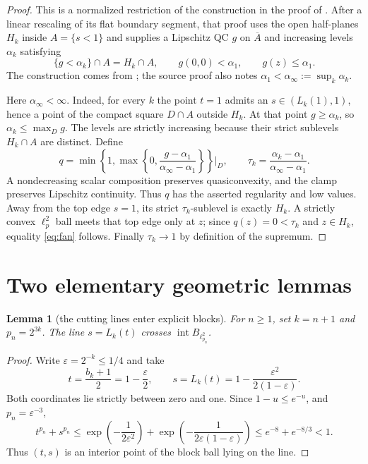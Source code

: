 \documentclass[11pt]{article}
\newtheorem{lemma}{Lemma}
\newcommand{\eps}{\varepsilon}
\begin{document}
\begin{proof}
This is a normalized restriction of the construction in the proof of
\cite[Theorem~3.2]{source}.  After a linear rescaling of its flat boundary
segment, that proof uses the open half-planes $H_k$ inside
$A=\{s<1\}$ and supplies a Lipschitz QC $g$ on $\overline A$ and increasing
levels $\alpha_k$ satisfying
\[
  \{g<\alpha_k\}\cap A=H_k\cap A,\qquad
  g(0,0)<\alpha_1,\qquad g(z)\le\alpha_1.
\]
The construction comes from \cite[Lemma~2.9]{fanpaper}; the source proof
also notes $\alpha_1<\alpha_\infty:=\sup_k\alpha_k$.

Here $\alpha_\infty<\infty$.  Indeed, for every $k$ the point $t=1$ admits
an $s\in(L_k(1),1)$, hence a point of the compact square $D\cap A$ outside
$H_k$.  At that point $g\ge\alpha_k$, so
$\alpha_k\le\max_D g$.  The levels are strictly increasing because their
strict sublevels $H_k\cap A$ are distinct.  Define
\[
 q=\min\!\left\{1,\max\!\left\{0,
       \frac{g-\alpha_1}{\alpha_\infty-\alpha_1}\right\}\right\}\Big|_D,
 \qquad
 \tau_k=\frac{\alpha_k-\alpha_1}
                  {\alpha_\infty-\alpha_1}.
\]
A nondecreasing scalar composition preserves quasiconvexity, and the clamp
preserves Lipschitz continuity.  Thus $q$ has the asserted regularity and
low values.  Away from the top edge $s=1$, its strict $\tau_k$-sublevel is
exactly $H_k$.  A strictly convex $\ell_p^2$ ball meets that top edge only
at $z$; since $q(z)=0<\tau_k$ and $z\in H_k$, equality
\eqref{eq:fan} follows.  Finally $\tau_k\to1$ by definition of the
supremum.
\end{proof}

\section{Two elementary geometric lemmas}

\begin{lemma}[the cutting lines enter explicit blocks]\label{lem:inside}
For $n\ge1$, set $k=n+1$ and $p_n=2^{3k}$.  The line $s=L_k(t)$ crosses
$\operatorname{int}B_{\ell_{p_n}^2}$.
\end{lemma}

\begin{proof}
Write $\eps=2^{-k}\le1/4$ and take
\[
 t=\frac{b_k+1}{2}=1-\frac\eps2,\qquad
 s=L_k(t)=1-\frac{\eps^2}{2(1-\eps)}.
\]
Both coordinates lie strictly between zero and one.  Since $1-u\le e^{-u}$,
and $p_n=\eps^{-3}$,
\[
 t^{p_n}+s^{p_n}
 \le \exp\!\left(-\frac1{2\eps^2}\right)
   +\exp\!\left(-\frac1{2\eps(1-\eps)}\right)
 \le e^{-8}+e^{-8/3}<1.
\]
Thus $(t,s)$ is an interior point of the block ball lying on the line.
\end{proof}
\end{document}
